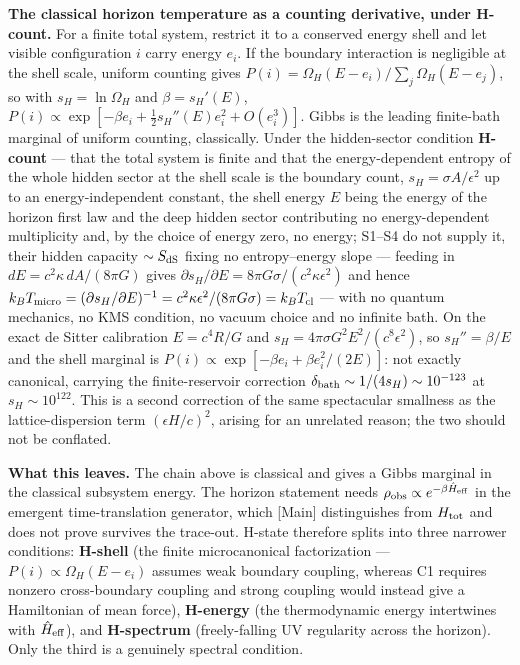\documentclass[
]{article}
\begin{document}
\textbf{The classical horizon temperature as a counting derivative,
under H-count.} For a finite total system, restrict it to a conserved
energy shell and let visible configuration \(i\) carry energy \(e_i\).
If the boundary interaction is negligible at the shell scale, uniform
counting gives \(P(i)=\Omega_H(E-e_i)/\sum_j\Omega_H(E-e_j)\), so with
\(s_H=\ln\Omega_H\) and \(\beta=s_H'(E)\),
\(P(i)\propto\exp[-\beta e_i+\tfrac12 s_H''(E)e_i^2+O(e_i^3)]\). Gibbs
is the leading finite-bath marginal of uniform counting, classically.
Under the hidden-sector condition \textbf{H-count} --- that the total
system is finite and that the energy-dependent entropy of the whole
hidden sector at the shell scale is the boundary count,
\(s_H=\sigma A/\epsilon^2\) up to an energy-independent constant, the
shell energy \(E\) being the energy of the horizon first law and the
deep hidden sector contributing no energy-dependent multiplicity and, by
the choice of energy zero, no energy; S1--S4 do not supply it, their
hidden capacity \(\sim S_{\rm dS}\) fixing no entropy--energy slope ---
feeding in \(dE=c^2\kappa\,dA/(8\pi G)\) gives
\(\partial s_H/\partial E=8\pi G\sigma/(c^2\kappa\epsilon^2)\) and hence
\(k_BT_{\rm micro}=(\partial s_H/\partial E)^{-1}=c^2\kappa\epsilon^2/(8\pi G\sigma)=k_BT_{\rm cl}\)
--- with no quantum mechanics, no KMS condition, no vacuum choice and no
infinite bath. On the exact de Sitter calibration \(E=c^4R/G\) and
\(s_H=4\pi\sigma G^2E^2/(c^8\epsilon^2)\), so \(s_H''=\beta/E\) and the
shell marginal is \(P(i)\propto\exp[-\beta e_i+\beta e_i^2/(2E)]\): not
exactly canonical, carrying the finite-reservoir correction
\(\delta_{\rm bath}\sim1/(4s_H)\sim10^{-123}\) at \(s_H\sim10^{122}\).
This is a second correction of the same spectacular smallness as the
lattice-dispersion term \((\epsilon H/c)^2\), arising for an unrelated
reason; the two should not be conflated.

\textbf{What this leaves.} The chain above is classical and gives a
Gibbs marginal in the classical subsystem energy. The horizon statement
needs \(\rho_{\rm obs}\propto e^{-\beta\hat H_{\rm eff}}\) in the
emergent time-translation generator, which {[}Main{]} distinguishes from
\(H_{\rm tot}\) and does not prove survives the trace-out. H-state
therefore splits into three narrower conditions: \textbf{H-shell} (the
finite microcanonical factorization --- \(P(i)\propto\Omega_H(E-e_i)\)
assumes weak boundary coupling, whereas C1 requires nonzero
cross-boundary coupling and strong coupling would instead give a
Hamiltonian of mean force), \textbf{H-energy} (the thermodynamic energy
intertwines with \(\hat H_{\rm eff}\)), and \textbf{H-spectrum}
(freely-falling UV regularity across the horizon). Only the third is a
genuinely spectral condition.
\end{document}
